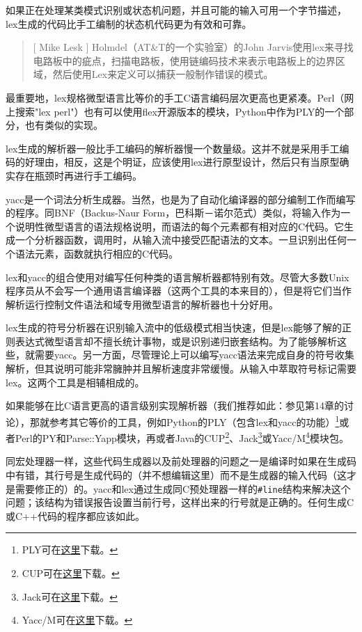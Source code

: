 \documentclass[12pt,oneside]{book}
\begin{document}
如果正在处理某类模式识别或状态机问题，并且可能的输入可用一个字节描述，lex生成的代码比手工编制的状态机代码更为有效和可靠。

\begin{quote}[ Mike Lesk 	]
Holmdel（AT\&{}T的一个实验室）的John Jarvis使用lex来寻找电路板中的疵点，扫描电路板，使用链编码技术来表示电路板上的边界区域，然后使用Lex来定义可以捕获一般制作错误的模式。
\end{quote}

最重要地，lex规格微型语言比等价的手工C语言编码层次更高也更紧凑。Perl（网上搜索"lex perl"）也有可以使用flex开源版本的模块，Python中作为PLY的一个部分，也有类似的实现。

lex生成的解析器一般比手工编码的解析器慢一个数量级。这并不就是采用手工编码的好理由，相反，这是个明证，应该使用lex进行原型设计，然后只有当原型确实存在瓶颈时再进行手工编码。

yacc是一个词法分析生成器。当然，也是为了自动化编译器的部分编制工作而编写的程序。同BNF（Backus-Naur Form，巴科斯－诺尔范式）类似，将输入作为一个说明性微型语言的语法规格说明，而语法的每个元素都有相对应的C代码。它生成一个分析器函数，调用时，从输入流中接受匹配语法的文本。一旦识别出任何一个语法元素，函数就执行相应的C代码。

lex和yacc的组合使用对编写任何种类的语言解析器都特别有效。尽管大多数Unix程序员从不会写一个通用语言编译器（这两个工具的本来目的），但是将它们当作解析运行控制文件语法和域专用微型语言的解析器也十分好用。

lex生成的符号分析器在识别输入流中的低级模式相当快速，但是lex能够了解的正则表达式微型语言却不擅长统计事物，或是识别递归嵌套结构。为了能够解析这些，就需要yacc。另一方面，尽管理论上可以编写yacc语法来完成自身的符号收集解析，但其说明可能非常臃肿并且解析速度非常缓慢。从输入中萃取符号标记需要lex。这两个工具是相辅相成的。

如果能够在比C语言更高的语言级别实现解析器（我们推荐如此：参见第14章的讨论），那就参考其它等价的工具，例如Python的PLY（包含lex和yacc的功能）\footnote{PLY可在\href{http://systems.cs.uchicago.edu/ply/}{这里}下载。}或者Perl的PY和Parse::Yapp模块，再或者Java的CUP\footnote{CUP可在\href{http://www.cs.princeton.edu/~appel/modern/java/CUP/}{这里}下载。}、Jack\footnote{Jack可在\href{http://www.javaworld.com/javaworld/jw-12-1996/jw-12-jack.html}{这里}下载。}或Yacc/M\footnote{Yacc/M可在\href{http://david.tribble.com/yaccm.html}{这里}下载。}模块包。

同宏处理器一样，这些代码生成器以及前处理器的问题之一是编译时如果在生成码中有错，其行号是生成代码的（并不想编辑这里）而不是生成器的输入代码（这才是需要修正的）的。yacc和lex通过生成同C预处理器一样的\verb+#line+结构来解决这个问题；该结构为错误报告设置当前行号，这样出来的行号就是正确的。任何生成C或C++代码的程序都应该如此。
\end{document}
